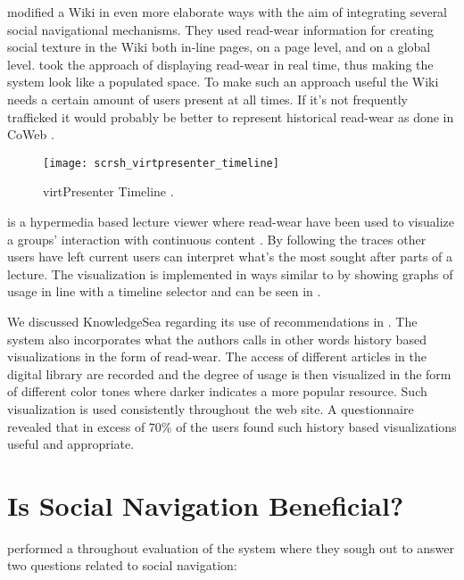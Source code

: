 \citet{xu06} modified a Wiki in even more elaborate ways
with the aim of integrating several social navigational mechanisms.
They used read-wear information for creating social
texture in the Wiki both in-line pages, on a page level, and on a global
level. \citeauthor{xu06} took the approach of displaying read-wear in real
time, thus making the system look like a populated space. To make such an
approach useful the Wiki needs a certain amount of users present at all times.
If it's not frequently trafficked it would probably be better to represent
historical read-wear as done in CoWeb \citep[]{dieberger00a}.

\begin{figure}
  \texttt{[image: scrsh\_virtpresenter\_timeline]}
  \caption[virtPresenter Timeline]{
    virtPresenter Timeline \citep[]{mertens06}.
  }
  \label{figure:scrsh.virtpresenter.timeline}
\end{figure}

 is a hypermedia based lecture viewer where read-wear
have been used to visualize a groups' interaction with continuous content
\citep{mertens06}. By following the traces other users have left current users
can interpret what's the most sought after parts of a lecture. The
visualization is implemented in ways similar to \citet{hill92} by showing
graphs of usage in line with a timeline selector and can be seen in
.

We discussed KnowledgeSea regarding its use of recommendations in
.
The system also incorporates what the authors calls
\citep[]{brusilovsky05}\dash{}in other words history based
visualizations in the form of read-wear. The access of different articles in
the digital library are recorded and the degree of usage is then visualized in
the form of different color tones where darker indicates a more popular
resource. Such visualization is used consistently throughout the web site. A
questionnaire revealed that in excess of 70\%
\citeyearpar[p.15]{brusilovsky05} of the users
found such history based visualizations useful and appropriate.

\section{Is Social Navigation Beneficial?}

\citet{svensson05} performed a throughout evaluation of the %
system where they sough out to answer two questions related to social
navigation:

